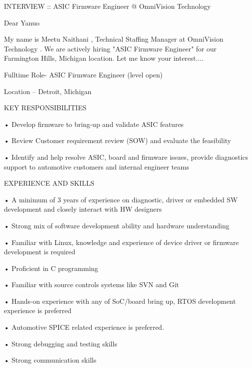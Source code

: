 \par INTERVIEW :: ASIC Firmware Engineer @ OmniVision Technology
\par Dear Yanuo
\par My name is Meetu Naithani , Technical Staffing Manager at OmniVision Technology . We are actively hiring "ASIC Firmware Engineer" for our Farmington Hills, Michigan location. Let me know your interest....
\par \smallbreak       %
\par Fulltime Role- ASIC Firmware Engineer (level open)
\par Location – Detroit, Michigan
\par KEY RESPONSIBILITIES
\par • Develop firmware to bring-up and validate ASIC features
\par • Review Customer requirement review (SOW) and evaluate the feasibility
\par • Identify and help resolve ASIC, board and firmware issues, provide diagnostics support to automotive customers and internal engineer teams
\par \smallbreak       %
\par EXPERIENCE AND SKILLS
\par • A minimum of 3 years of experience on diagnostic, driver or embedded SW development and closely interact with HW designers
\par • Strong mix of software development ability and hardware understanding
\par • Familiar with Linux, knowledge and experience of device driver or firmware development is required
\par • Proficient in C programming
\par • Familiar with source controls systems like SVN and Git
\par • Hands-on experience with any of SoC/board bring up, RTOS development experience is preferred
\par • Automotive SPICE related experience is preferred.
\par • Strong debugging and testing skills
\par • Strong communication skills

\vfil
\break %

